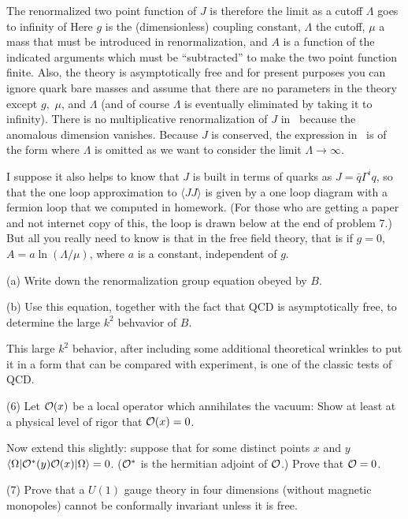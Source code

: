 The renormalized two point function of $J$ 
is therefore the limit as a cutoff $\Lambda$ goes to infinity
of
\eqn{}
Here $g$ is the (dimensionless)
coupling constant, $\Lambda$ the cutoff, $\mu$ a mass that
must be introduced in renormalization, and $A$ is a function of the
indicated arguments which must be ``subtracted'' to make the two point function
finite.  Also, the theory is asymptotically
free and for present purposes you can ignore quark bare masses and assume that
there are no parameters in the theory except $g, $ $\mu$, and $\Lambda$
(and of course $\Lambda$ is eventually eliminated by taking it to infinity).  
There is no multiplicative
renormalization of $J$ in \jury\ because the anomalous dimension vanishes.
Because $J$ is conserved, the expression in \jury\ is of the form
\eqn{}
where $\Lambda$ is omitted as we want to consider the limit $\Lambda\to\infty$.

I suppose it also helps to know that $J$ is built in terms of quarks as
$J=\bar q\Gamma^i q$, so that the one loop approximation to $\langle J 
J\rangle$
is given by a one loop diagram with a fermion loop that we computed in 
homework.
(For those who are getting a paper and not internet copy of this, the loop
is drawn below at the end of problem 7.)  
But all you  really need to know is that in the free field
theory, that is if $g=0$, 
$A=a \ln(\Lambda/\mu)$, where $a$ is a constant, independent of $g$.

(a) Write down the  renormalization group equation obeyed by $B$.

(b) Use this equation, together with the fact that QCD is asymptotically
free, to determine the large $k^2$ behvavior of $B$.

This large $k^2$ behavior, after including some additional theoretical
wrinkles to put it in a form that can be compared with experiment,  
is one of the classic tests of QCD.

(6) Let ${\cal O}(x)$ be a local operator which annihilates the vacuum:
\eqn{}
Show at least at a physical level of rigor that ${\cal O}(x)=0$.

Now extend this slightly: suppose that for some distinct points $x$ and $y$
$\langle \Omega|{\cal O}^*(y) {\cal O}(x)|\Omega\rangle=0$.
(${\cal O}^*$ is the hermitian adjoint of ${\cal O}$.) Prove that ${\cal O}=0$.

(7) Prove that a $U(1)$ gauge theory in four dimensions (without magnetic 
monopoles) cannot
be conformally invariant unless it is free.

